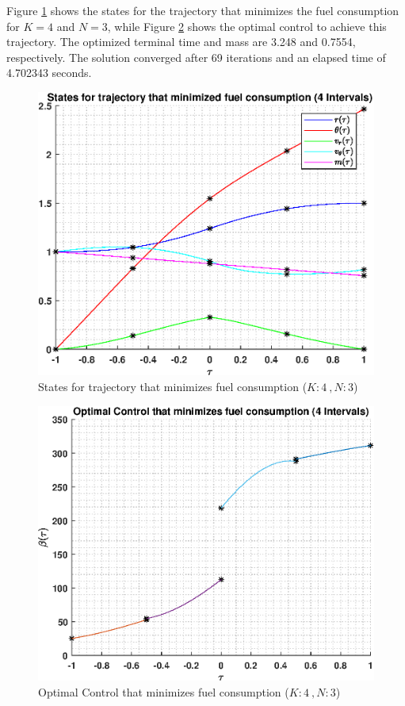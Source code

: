 \documentclass[]{article}
\begin{document}
Figure \ref{fig:directStatesK4Poly3} shows the states for the trajectory that minimizes the fuel consumption for \(K = 4\) and  \(N = 3\), while Figure \ref{fig:directControlK4Poly3} shows the optimal control to achieve this trajectory. The optimized terminal time and mass are 3.248 and 0.7554, respectively. The solution converged after 69 iterations and an elapsed time of 4.702343 seconds.
\begin{figure}
	\centering
	\includegraphics[scale=0.75]{directStatesK4Poly3.eps}
	\caption{States for trajectory that minimizes fuel consumption (\(K:4\ , N:3\))}
	\label{fig:directStatesK4Poly3}
\end{figure}
\begin{figure}
	\centering
	\includegraphics[scale=0.75]{directControlK4Poly3.eps}
	\caption{Optimal Control that minimizes fuel consumption (\(K:4\ , N:3\))}
	\label{fig:directControlK4Poly3}
\end{figure}
\FloatBarrier
\end{document}
